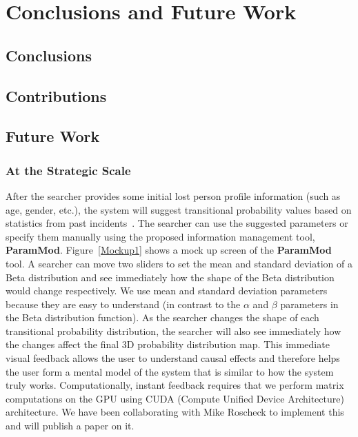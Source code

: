 \chapter[Conclusions and Future Work]{Conclusions and Future Work}
\label{chap:Conclusions}

\section{Conclusions}
\label{conclusions}


\section{Contributions}
\label{contributions}

\section{Future Work}
\label{futurework}

\subsection{At the Strategic Scale}

After the searcher provides some initial lost person profile information (such as age, gender, etc.), the system will suggest transitional probability values based on statistics from past incidents~\cite{Koester2008Lost}. The searcher can use the suggested parameters or specify them manually using the proposed information management tool, \textbf{ParamMod}. Figure~\ref{Mockup1} shows a mock up screen of the \textbf{ParamMod} tool. A searcher can move two sliders to set the mean and standard deviation of a Beta distribution and see immediately how the shape of the Beta distribution would change respectively. We use mean and standard deviation parameters because they are easy to understand (in contrast to the $\alpha$ and $\beta$ parameters in the Beta distribution function). As the searcher changes the shape of each transitional probability distribution, the searcher will also see immediately how the changes affect the final 3D probability distribution map. This immediate visual feedback allows the user to understand causal effects and therefore helps the user form a mental model of the system that is similar to how the system truly works. Computationally, instant feedback requires that we perform matrix computations on the GPU using CUDA (Compute Unified Device Architecture) architecture. We have been collaborating with Mike Roscheck to implement this and will publish a paper on it.

